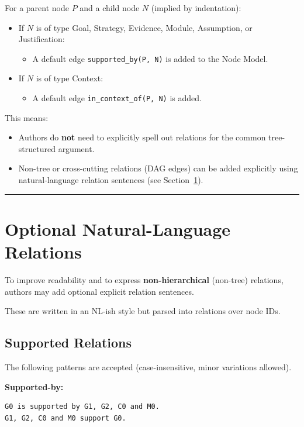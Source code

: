 \documentclass[11pt]{article}
\begin{document}
For a parent node \(P\) and a child node \(N\) (implied by indentation):
\begin{itemize}[leftmargin=2em]
  \item If \(N\) is of type Goal, Strategy, Evidence, Module, Assumption, or Justification:
  \begin{itemize}[leftmargin=1.5em]
    \item A default edge \texttt{supported\_by(P, N)} is added to the Node Model.
  \end{itemize}

  \item If \(N\) is of type Context:
  \begin{itemize}[leftmargin=1.5em]
    \item A default edge \texttt{in\_context\_of(P, N)} is added.
  \end{itemize}
\end{itemize}

This means:
\begin{itemize}[leftmargin=2em]
  \item Authors do \textbf{not} need to explicitly spell out relations for the common tree-structured argument.
  \item Non-tree or cross-cutting relations (DAG edges) can be added explicitly using natural-language relation sentences (see Section~\ref{sec:nl-relations}).
\end{itemize}

\bigskip
\hrule
\bigskip

\section{Optional Natural-Language Relations}
\label{sec:nl-relations}

To improve readability and to express \textbf{non-hierarchical} (non-tree) relations, authors may add optional explicit relation sentences.

These are written in an NL-ish style but parsed into relations over node IDs.

\subsection{Supported Relations}

The following patterns are accepted (case-insensitive, minor variations allowed).

\textbf{Supported-by:}
\begin{verbatim}
G0 is supported by G1, G2, C0 and M0.
G1, G2, C0 and M0 support G0.
\end{verbatim}
\end{document}
